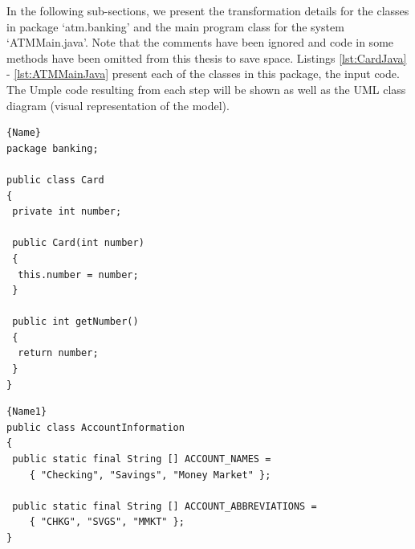 
In the following sub-sections, we present the transformation details for the classes in package `atm.banking' and the main program class for the system `ATMMain.java'. Note that the comments have been ignored and code in some methods have been omitted from this thesis to save space.  Listings \ref{lst:CardJava} - \ref{lst:ATMMainJava} present each of the classes in this package, the input code. The Umple code resulting from each step will be shown as well as the UML class diagram (visual representation of the model). 

\noindent\begin{minipage}{.45\textwidth}
\begin{lstlisting}[style=java,caption=Card.java,label=lst:CardJava]{Name}
package banking;

public class Card
{
 private int number;
    
 public Card(int number)
 {
  this.number = number;
 }
    
 public int getNumber()
 {
  return number;
 }   
}
\end{lstlisting}
\end{minipage}\hfill
\begin{minipage}{.45\textwidth}
\begin{lstlisting}[style=java,caption=AccountInfo.java,label=lst:AccountInformation]{Name1}
public class AccountInformation
{
 public static final String [] ACCOUNT_NAMES =
    { "Checking", "Savings", "Money Market" };
         
 public static final String [] ACCOUNT_ABBREVIATIONS =
    { "CHKG", "SVGS", "MMKT" };
}    
\end{lstlisting}
\end{minipage}


